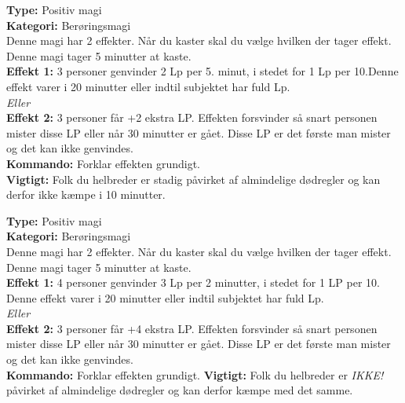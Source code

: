 \begin{åndens gave*}
\textbf{Type:} Positiv magi\\
\textbf{Kategori:} Berøringsmagi\\
Denne magi har 2 effekter. Når du kaster skal du vælge hvilken der tager effekt. Denne magi tager 5 minutter at kaste.\\
\textbf{Effekt 1:} 3 personer genvinder 2 Lp per 5. minut, i stedet for 1 Lp per 10.Denne effekt varer i 20 minutter eller indtil subjektet har fuld Lp.\\
\emph{\textit{Eller}}\\
\textbf{Effekt 2:} 3 personer får +2 ekstra LP. Effekten forsvinder så snart personen mister disse LP eller når 30 minutter er gået. Disse LP er det første man mister og det kan ikke genvindes.\\
\textbf{Kommando:} Forklar effekten grundigt.\\
\textbf{Vigtigt:} Folk du helbreder er stadig påvirket af almindelige dødregler og kan derfor ikke kæmpe i 10 minutter.
\end{åndens gave*}

\begin{åndens gave*}
\textbf{Type:} Positiv magi\\
\textbf{Kategori:} Berøringsmagi\\
Denne magi har 2 effekter. Når du kaster skal du vælge hvilken der tager effekt. Denne magi tager 5 minutter at kaste.\\
\textbf{Effekt 1:} 4 personer genvinder 3 Lp per 2 minutter, i stedet for 1 LP per 10. Denne effekt varer i 20 minutter eller indtil subjektet har fuld Lp.\\
\emph{\textit{Eller}}\\
\textbf{Effekt 2:} 3 personer får +4 ekstra LP. Effekten forsvinder så snart personen mister disse LP eller når 30 minutter er gået. Disse LP er det første man mister og det kan ikke genvindes.\\
\textbf{Kommando:} Forklar effekten grundigt.
\textbf{Vigtigt:} Folk du helbreder er \emph{IKKE!} påvirket af almindelige dødregler og kan derfor kæmpe med det
samme.
\end{åndens gave*}

